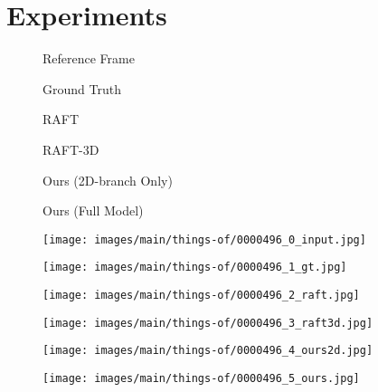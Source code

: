 \documentclass[10pt,twocolumn,letterpaper]{article}
\begin{document}
\section{Experiments}

\begin{figure*}
    \captionsetup[subfigure]{labelformat=empty}
    
\begin{subfigure}[b]{0.165\linewidth}
        \caption{Reference Frame}
    \end{subfigure}\hfill
    \begin{subfigure}[b]{0.165\linewidth}
        \caption{Ground Truth}
    \end{subfigure}\hfill
    \begin{subfigure}[b]{0.165\linewidth}
        \caption{RAFT}
    \end{subfigure}\hfill
    \begin{subfigure}[b]{0.165\linewidth}
        \caption{RAFT-3D}
    \end{subfigure}\hfill
    \begin{subfigure}[b]{0.165\linewidth}
        \caption{Ours (2D-branch Only)}
    \end{subfigure}\hfill
    \begin{subfigure}[b]{0.165\linewidth}
        \caption{Ours (Full Model)}
    \end{subfigure}\hfill
    
    \vspace{-3pt}
    \begin{subfigure}[b]{0.165\linewidth}
        \texttt{[image: images/main/things-of/0000496\_0\_input.jpg]}
    \end{subfigure}\hfill
    \begin{subfigure}[b]{0.165\linewidth}
        \texttt{[image: images/main/things-of/0000496\_1\_gt.jpg]}
    \end{subfigure}\hfill
    \begin{subfigure}[b]{0.165\linewidth}
        \texttt{[image: images/main/things-of/0000496\_2\_raft.jpg]}
    \end{subfigure}\hfill
    \begin{subfigure}[b]{0.165\linewidth}
        \texttt{[image: images/main/things-of/0000496\_3\_raft3d.jpg]}
    \end{subfigure}\hfill
    \begin{subfigure}[b]{0.165\linewidth}
        \texttt{[image: images/main/things-of/0000496\_4\_ours2d.jpg]}
    \end{subfigure}\hfill
    \begin{subfigure}[b]{0.165\linewidth}
        \texttt{[image: images/main/things-of/0000496\_5\_ours.jpg]}
    \end{subfigure}\hfill


\end{figure*}
\end{document}
